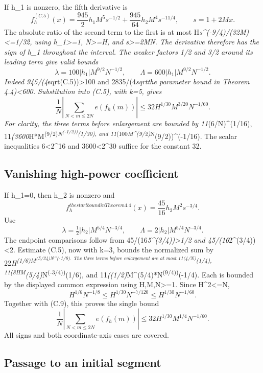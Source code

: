 \documentclass[11pt,a4paper]{article}
\begin{document}
If h\_1 is nonzero, the fifth derivative is \[
f_h^{(C.5)}(x)=\frac{945}{2}h_1M^5s^{-1/2}
             +\frac{945}{64}h_2M^4s^{-11/4},\qquad s=1+2Mx.
\] The absolute ratio of the second term to the first is at most
H\emph{s\^{}(-9/4)/(32M)\textless=1/32, using
\textbar h\_1\textbar\textgreater=1, N\textgreater=H, and
s\textgreater=2MN. The derivative therefore has the sign of h\_1
throughout the interval. The weaker factors 1/2 and 3/2 around its
leading term give valid bounds \[
\lambda=100|h_1|M^{9/2}N^{-1/2},\qquad
\Lambda=600|h_1|M^{9/2}N^{-1/2}. \tag{C.8}
\] Indeed 945/(4}sqrt(C.5))\textgreater100 and 2835/(4\emph{sqrtthe
parameter bound in Theorem 4.4)\textless600. Substitution into (C.5),
with k=5, gives \[
\frac1N\left|\sum_{N<m\le2N}e(f_h(m))\right|
\le32H^{1/30}M^{3/20}N^{-1/60}. \tag{C.9}
\] For clarity, the three terms before enlargement are bounded by
11}(6/N)\^{}(1/16),
11\emph{(3600}H*M\textsuperscript{(9/2)\emph{N\textsuperscript{(-1/2))}(1/30),
and 11}(100\emph{M\^{}(9/2)}N}(9/2))\^{}(-1/16). The scalar inequalities
6\textless2\^{}16 and 3600\textless2\^{}30 suffice for the constant 32.

\subsection{Vanishing high-power
coefficient}\label{vanishing-high-power-coefficient}

If h\_1=0, then h\_2 is nonzero and \[
f_h^{the start bound in Theorem 4.4}(x)=\frac{45}{16}h_2M^2s^{-3/4}.
\] Use \[
\lambda=\tfrac12|h_2|M^{5/4}N^{-3/4},\qquad
\Lambda=2|h_2|M^{5/4}N^{-3/4}.
\] The endpoint comparisons follow from
45/(16\emph{5\^{}(3/4))\textgreater1/2 and 45/(16}2\^{}(3/4))\textless2.
Estimate (C.5), now with k=3, bounds the normalized sum by
22\emph{H\textsuperscript{(1/6)\emph{M\textsuperscript{(5/24)\emph{N\^{}(-1/8).
The three terms before enlargement are at most 11}(4/N)}(1/4),
11}(8\emph{H}M}(5/4)}N\textsuperscript{(-3/4))}(1/6), and
11\emph{((1/2)}M\^{}(5/4)*N\textsuperscript{(9/4))}(-1/4). Each is
bounded by the displayed common expression using H,M,N\textgreater=1.
Since H\^{}2\textless=N, \[
H^{1/6}N^{-1/8}
\le H^{1/30}N^{-7/120}
\le H^{1/30}N^{-1/60}.
\] Together with (C.9), this proves the single bound \[
\frac1N\left|\sum_{N<m\le2N}e(f_h(m))\right|
\le32H^{1/30}M^{1/4}N^{-1/60}. \tag{C.10}
\] All signs and both coordinate-axis cases are covered.

\subsection{Passage to an initial
segment}\label{passage-to-an-initial-segment}
\end{document}
